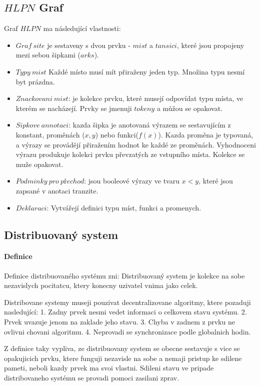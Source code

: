\subsection{$HLPN$ Graf}
Graf $HLPN$ ma následující vlastnosti:
\begin{itemize}
  \item $Graf\:site$ je sestaveny s dvou prvku - $mist$ a $tansici$, které jsou propojeny mezi sebou šipkami ($arks$).
  \item $Typy\:mist$ Každé místo musí mít přiraženy jeden typ. Množina typu nesmí byt prázdna.
  \item $Znackovani\:mist$: je kolekce prvku, které musejí odpovídat typu místa, ve kterém se nacházejí. Prvky se jmenuji $tokeny$ a můžou se opakovat.
  \item $Sipkove\:annotaci$: kazda šipka je anotovaná výrazem se sestavujícím z konstant, proměnách ($x, y$) nebo funkci($f(x)$). Kazda proměna je typovaná, a výrazy se provádějí přiražením hodnot ke každé ze proměnách. Vyhodnoceni výrazu produkuje kolekci prvku převzatých ze vstupního místa. Kolekce se muže opakovat.
  \item $Podminky\:pro\:přechod$: jsou booleové výrazy ve tvaru $x < y$, které jsou zapsané v anotaci tranzite.
  \item $Deklaraci$: Vytvářejí definici typu míst, funkci a promenych.
\end{itemize}

\subsection{Distribuovaný system}

\paragraph{Definice}

Definice distribuovaného systému zni:
Distribuovaný system je kolekce na sobe nezavislych pocitatcu, ktery konecny uzivatel vnima jako celek. 

Distribovane systemy museji pouzivat decentralizovane algoritmy, ktere pozaduji nasledující: 1. Zadny prvek nesmi vedet informaci o celkovem stavu systému. 2. Prvek uvazuje jenom na zaklade jeho stavu. 3. Chyba v zadnem z prvku ne ovlivni chovani algoritmu. 4. Neprovadi se synchronizace podle globalnich hodin. 

Z definice taky vypliva, ze distribuovany system se obecne sestavuje s vice se opakujicich prvku, ktere funguji nezavisle na sobe a nemaji pristup ke sdilene pameti, neboli kazdy prvek ma svoi vlastni. Sdileni stavu ve pripade distribovaneho systému se provadi pomoci zasilani zprav.


